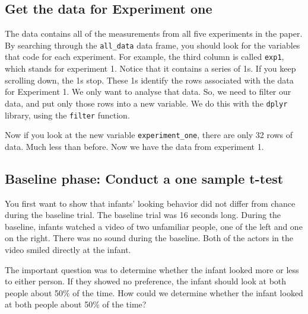 \documentclass[]{book}
\newenvironment{Shaded}{\begin{snugshade}}{\end{snugshade}}
\newcommand{\KeywordTok}[1]{\textcolor[rgb]{0.13,0.29,0.53}{\textbf{#1}}}
\newcommand{\DecValTok}[1]{\textcolor[rgb]{0.00,0.00,0.81}{#1}}
\newcommand{\StringTok}[1]{\textcolor[rgb]{0.31,0.60,0.02}{#1}}
\newcommand{\OperatorTok}[1]{\textcolor[rgb]{0.81,0.36,0.00}{\textbf{#1}}}
\newcommand{\NormalTok}[1]{#1}
\begin{document}
\subsection{Get the data for Experiment
one}\label{get-the-data-for-experiment-one}

The data contains all of the measurements from all five experiments in
the paper. By searching through the \texttt{all\_data} data frame, you
should look for the variables that code for each experiment. For
example, the third column is called \texttt{exp1}, which stands for
experiment 1. Notice that it contains a series of 1s. If you keep
scrolling down, the 1s stop. These 1s identify the rows associated with
the data for Experiment 1. We only want to analyse that data. So, we
need to filter our data, and put only those rows into a new variable. We
do this with the \texttt{dplyr} library, using the \texttt{filter}
function.

\begin{Shaded}
\end{Shaded}

Now if you look at the new variable \texttt{experiment\_one}, there are
only 32 rows of data. Much less than before. Now we have the data from
experiment 1.

\subsection{Baseline phase: Conduct a one sample
t-test}\label{baseline-phase-conduct-a-one-sample-t-test}

You first want to show that infants' looking behavior did not differ
from chance during the baseline trial. The baseline trial was 16 seconds
long. During the baseline, infants watched a video of two unfamiliar
people, one of the left and one on the right. There was no sound during
the baseline. Both of the actors in the video smiled directly at the
infant.

The important question was to determine whether the infant looked more
or less to either person. If they showed no preference, the infant
should look at both people about 50\% of the time. How could we
determine whether the infant looked at both people about 50\% of the
time?
\end{document}
